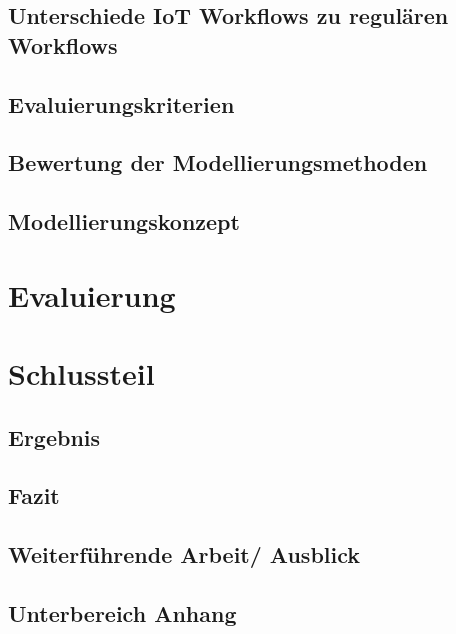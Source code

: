 \documentclass[a4paper, 12pt, twoside, headsepline=true]{scrartcl} %
\begin{document}
\subsection{Unterschiede IoT Workflows zu regulären Workflows}

\subsection{Evaluierungskriterien}

\subsection{Bewertung der Modellierungsmethoden}

\subsection{Modellierungskonzept}

\newpage

\section{Evaluierung}

\newpage

\section{Schlussteil}

\subsection{Ergebnis}

\subsection{Fazit}

\subsection{Weiterführende Arbeit/ Ausblick}

\newpage

\printbibliography[heading=none]
\newpage
{}
\subsection*{Unterbereich Anhang}
\end{document}
